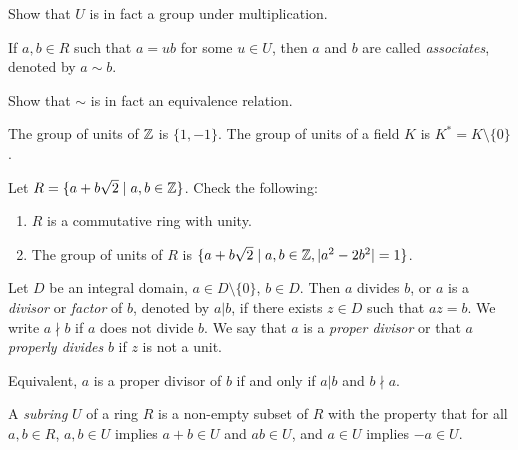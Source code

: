 \begin{exercise}
  Show that $U$ is in fact a group under multiplication.
\end{exercise}

\begin{definition}[Associate]
  If $a, b \in R$ such that $a = ub$ for some
  $u \in U$, then $a$ and $b$ are called
  \emph{associates}, denoted by $a \sim b$.
\end{definition}

\begin{exercise}
  Show that $\sim$ is in fact an equivalence relation.
\end{exercise}

\begin{example}
  The group of units of $\mathbb{Z}$ is $\{1, -1\}$. The group
  of units of a field $K$ is $K^* = K \setminus \{0\}$.
\end{example}

\begin{exercise}
  Let $R = \{a + b \sqrt{2} \mid a, b \in \mathbb{Z}\}$. Check
  the following:
  \begin{enumerate}
    \item $R$ is a commutative ring with unity.
    \item The group of units of $R$ is
      $\{a + b \sqrt{2} \mid a, b \in \mathbb{Z}, |a^2 - 2b^2| = 1\}$.
  \end{enumerate}
\end{exercise}

\begin{definition}[Divisor]
  Let $D$ be an integral domain, $a \in D \setminus \{0\}$,
  $b \in D$. Then $a$ divides $b$, or $a$ is a
  \emph{divisor} or \emph{factor} of $b$, denoted by
  $a | b$, if there exists $z \in D$ such that $az = b$.
  We write $a {\nmid} b$ if $a$ does not divide $b$.
  We say that $a$ is a \emph{proper divisor} or
  that $a$ \emph{properly divides} $b$ if $z$ is not
  a unit.
\end{definition}

\begin{remark}
  Equivalent, $a$ is a proper divisor of $b$ if
  and only if $a | b$ and $b {\nmid} a$.
\end{remark}

\begin{definition}[Subring]
  A \emph{subring} $U$ of a ring $R$ is a non-empty
  subset of $R$ with the property that for all
  $a, b \in R$, $a, b \in U$ implies $a + b \in U$
  and $ab \in U$,
  and $a \in U$ implies $-a \in U$.
\end{definition}

